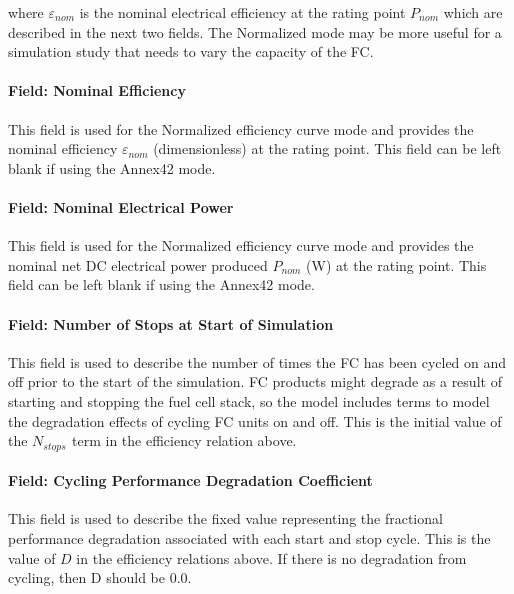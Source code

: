where \({\varepsilon_{nom}}\) is the nominal electrical efficiency at the rating point \({P_{nom}}\) which are described in the next two fields. The Normalized mode may be more useful for a simulation study that needs to vary the capacity of the FC.

\paragraph{Field: Nominal Efficiency}\label{field-nominal-efficiency}

This field is used for the Normalized efficiency curve mode and provides the nominal efficiency \({\varepsilon_{nom}}\) (dimensionless) at the rating point. This field can be left blank if using the Annex42 mode.

\paragraph{Field: Nominal Electrical Power}\label{field-nominal-electrical-power}

This field is used for the Normalized efficiency curve mode and provides the nominal net DC electrical power produced \({P_{nom}}\) (W) at the rating point. This field can be left blank if using the Annex42 mode.

\paragraph{Field: Number of Stops at Start of Simulation}\label{field-number-of-stops-at-start-of-simulation}

This field is used to describe the number of times the FC has been cycled on and off prior to the start of the simulation. FC products might degrade as a result of starting and stopping the fuel cell stack, so the model includes terms to model the degradation effects of cycling FC units on and off. This is the initial value of the \({N_{stops}}\) \emph{\(_{}\)}term in the efficiency relation above.

\paragraph{Field: Cycling Performance Degradation Coefficient}\label{field-cycling-performance-degradation-coefficient}

This field is used to describe the fixed value representing the fractional performance degradation associated with each start and stop cycle. This is the value of \(D\) in the efficiency relations above. If there is no degradation from cycling, then D should be 0.0.

